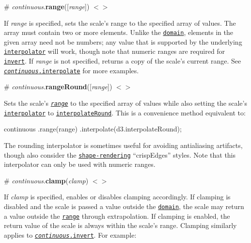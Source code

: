 \label{_continuous_range}%
\# {\itshape continuous}.{\bfseries range}(\mbox{[}{\itshape range}\mbox{]}) \href{https://github.com/d3/d3-scale/blob/master/src/continuous.js#L96}{\tt $<$$>$}

If {\itshape range} is specified, sets the scale’s range to the specified array of values. The array must contain two or more elements. Unlike the \href{#continuous_domain}{\tt domain}, elements in the given array need not be numbers; any value that is supported by the underlying \href{#continuous_interpolate}{\tt interpolator} will work, though note that numeric ranges are required for \href{#continuous_invert}{\tt invert}. If {\itshape range} is not specified, returns a copy of the scale’s current range. See \href{#continuous_interpolate}{\tt {\itshape continuous}.interpolate} for more examples.

\label{_continuous_rangeRound}%
\# {\itshape continuous}.{\bfseries range\+Round}(\mbox{[}{\itshape range}\mbox{]}) \href{https://github.com/d3/d3-scale/blob/master/src/continuous.js#L100}{\tt $<$$>$}

Sets the scale’s \href{#continuous_range}{\tt {\itshape range}} to the specified array of values while also setting the scale’s \href{#continuous_interpolate}{\tt interpolator} to \href{https://github.com/d3/d3-interpolate#interpolateRound}{\tt interpolate\+Round}. This is a convenience method equivalent to\+:


\begin{DoxyCode}
continuous
    .range(range)
    .interpolate(d3.interpolateRound);
\end{DoxyCode}


The rounding interpolator is sometimes useful for avoiding antialiasing artifacts, though also consider the \href{https://developer.mozilla.org/en-US/docs/Web/SVG/Attribute/shape-rendering}{\tt shape-\/rendering} “crisp\+Edges” styles. Note that this interpolator can only be used with numeric ranges.

\label{_continuous_clamp}%
\# {\itshape continuous}.{\bfseries clamp}({\itshape clamp}) \href{https://github.com/d3/d3-scale/blob/master/src/continuous.js#L104}{\tt $<$$>$}

If {\itshape clamp} is specified, enables or disables clamping accordingly. If clamping is disabled and the scale is passed a value outside the \href{#continuous_domain}{\tt domain}, the scale may return a value outside the \href{#continuous_range}{\tt range} through extrapolation. If clamping is enabled, the return value of the scale is always within the scale’s range. Clamping similarly applies to \href{#continuous_invert}{\tt {\itshape continuous}.invert}. For example\+:



